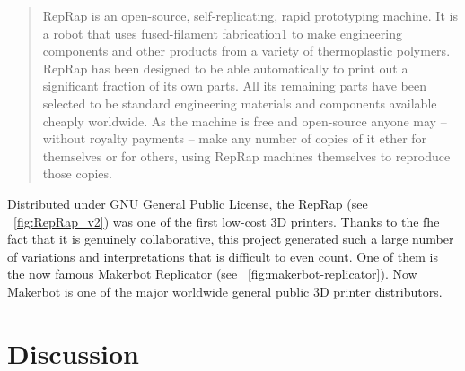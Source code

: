 \begin{quotation}
    RepRap is an open-source, self-replicating, rapid prototyping machine. It is a robot that uses fused-filament fabrication1 to make engineering components and other products from a variety of thermoplastic polymers. RepRap has been designed to be able automatically to print out a significant fraction of its own parts. All its remaining parts have been selected to be standard engineering materials and components available cheaply worldwide. As the machine is free and open-source anyone may – without royalty payments – make any number of copies of it ether for themselves or for others, using RepRap machines themselves to reproduce those copies.

\end{quotation}


\begin{figure}[tb]
\centering
    \hfil
    \caption{}
    \label{fig:RepRap_project}
\end{figure}


Distributed under GNU General Public License, the RepRap (see \figurename~\ref{fig:RepRap_v2}) was one of the first low-cost 3D printers. Thanks to the fhe fact that it is genuinely collaborative, this project generated such a large number of variations and interpretations that is difficult to even count. One of them is the now famous Makerbot Replicator (see \figurename~\ref{fig:makerbot-replicator}). Now Makerbot is one of the major worldwide general public 3D printer distributors.



\section{Discussion}








